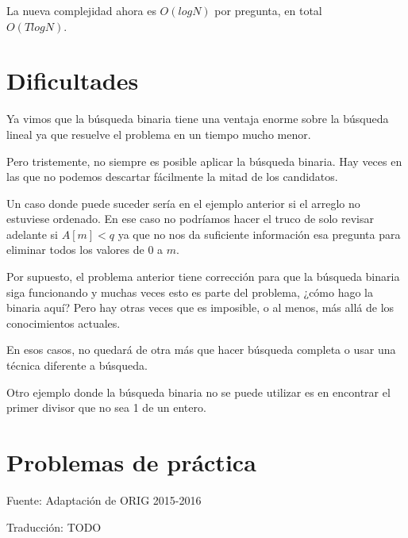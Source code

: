 La nueva complejidad ahora es \(O(logN)\) por pregunta, en total\\ \(O(TlogN)\).

\section{Dificultades}
Ya vimos que la búsqueda binaria tiene una ventaja enorme sobre la búsqueda lineal ya que resuelve el problema en un tiempo mucho menor.

Pero tristemente, no siempre es posible aplicar la búsqueda binaria. Hay veces en las que no podemos descartar fácilmente la mitad de los candidatos.

Un caso donde puede suceder sería en el ejemplo anterior si el arreglo no estuviese ordenado. En ese caso no podríamos hacer el truco de solo revisar adelante si \(A[m]<q\) ya que no nos da suficiente información esa pregunta para eliminar todos los valores de \(0\) a \(m\).

Por supuesto, el problema anterior tiene corrección para que la búsqueda binaria siga funcionando y muchas veces esto es parte del problema, ¿cómo hago la binaria aquí? Pero hay otras veces que es imposible, o al menos, más allá de los conocimientos actuales.

En esos casos, no quedará de otra más que hacer búsqueda completa o usar una técnica diferente a búsqueda.

Otro ejemplo donde la búsqueda binaria no se puede utilizar es en encontrar el primer divisor que no sea 1 de un entero.

\section*{Problemas de práctica}

\begin{exercise}
\end{exercise}

\begin{exercise}
	Fuente: Adaptación de ORIG 2015-2016
\end{exercise}

\begin{exercise}
	Traducción: TODO
\end{exercise}

